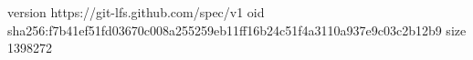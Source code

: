 version https://git-lfs.github.com/spec/v1
oid sha256:f7b41ef51fd03670c008a255259eb11ff16b24c51f4a3110a937e9c03c2b12b9
size 1398272

